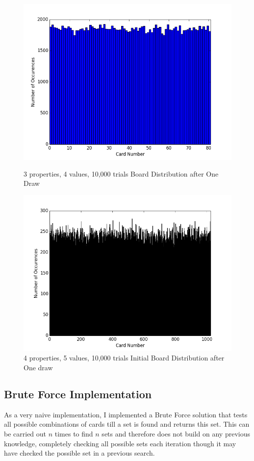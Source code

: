 \documentclass[pageno]{jpaper}
\begin{document}
\begin{figure}[htbb]
\begin{minipage}[b]{0.5\linewidth}
\centering
\includegraphics[width=.75\linewidth]{3p4v10000Draw.png}
\caption{3 properties, 4 values, 10,000 trials Board Distribution after One Draw}
\label{fig:draw1}
\end{minipage}
\hspace{0.5cm}
\begin{minipage}[b]{0.5\linewidth}
\centering
\includegraphics[width=.75\linewidth]{4p5v10000Draw.png}
\caption{4 properties, 5 values, 10,000 trials Initial Board Distribution after One draw}
\label{fig:draw2}
\end{minipage}
\end{figure}

\subsection{Brute Force Implementation}

As a very naive implementation, I implemented a Brute Force solution that tests all possible combinations of cards till a set is found and returns this set. This can be carried out $n$ times to find $n$ sets and therefore does not build on any previous knowledge, completely checking all possible sets each iteration though it may have checked the possible set in a previous search. 
\end{document}
